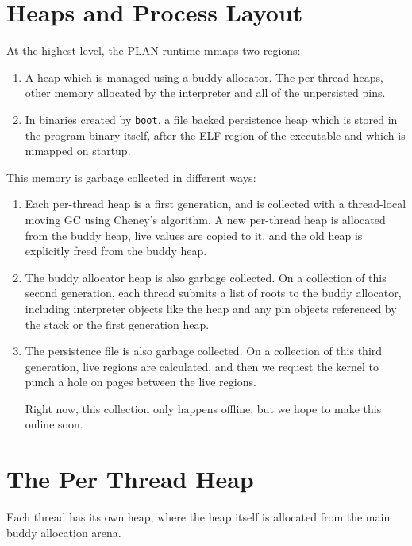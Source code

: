 \section{Heaps and Process Layout}

At the highest level, the PLAN runtime mmaps two regions:

\begin{enumerate}
\item
A heap which is managed using a buddy allocator. The per-thread heaps, other
memory allocated by the interpreter and all of the unpersisted pins.

\item
In binaries created by \lstinline|boot|, a file backed persistence heap which
is stored in the program binary itself, after the ELF region of the executable
and which is mmapped on startup.
\end{enumerate}

This memory is garbage collected in different ways:

\begin{enumerate}
\item
Each per-thread heap is a first generation, and is collected with a
thread-local moving GC using Cheney's algorithm. A new per-thread heap is
allocated from the buddy heap, live values are copied to it, and the old heap
is explicitly freed from the buddy heap.

\item
The buddy allocator heap is also garbage collected. On a collection of this
second generation, each thread submits a list of roots to the buddy allocator,
including interpreter objects like the heap and any pin objects referenced by
the stack or the first generation heap.

\item
The persistence file is also garbage collected. On a collection of this third
generation, live regions are calculated, and then we request the kernel to
punch a hole on pages between the live regions.

Right now, this collection only happens offline, but we hope to make this
online soon.
\end{enumerate}

\section{The Per Thread Heap}

Each thread has its own heap, where the heap itself is allocated from the main
buddy allocation arena.

